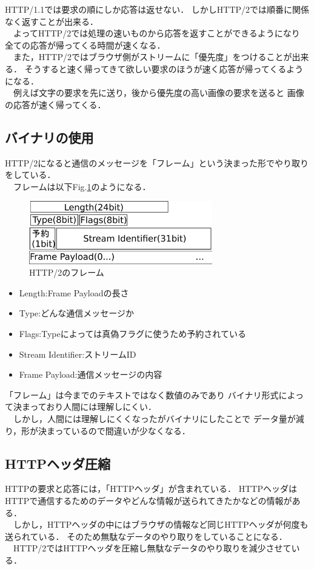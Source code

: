 \documentclass[a4j,9pt,twocolumn]{jsarticle}
\begin{document}
HTTP/1.1では要求の順にしか応答は返せない．
しかしHTTP/2では順番に関係なく返すことが出来る．
\\　よってHTTP/2では処理の速いものから応答を返すことができるようになり
全ての応答が帰ってくる時間が速くなる．
\\　また，HTTP/2ではブラウザ側がストリームに「優先度」をつけることが出来る．
そうすると速く帰ってきて欲しい要求のほうが速く応答が帰ってくるようになる．
\\　例えば文字の要求を先に送り，後から優先度の高い画像の要求を送ると
画像の応答が速く帰ってくる．



\subsection{バイナリの使用}
HTTP/2になると通信のメッセージを「フレーム」という決まった形でやり取りをしている．
\\　フレームは以下Fig.\ref{HTTP2frame}のようになる．
\begin{figure}[h]
\centering
\includegraphics[width=80mm]{img/frame2.eps}
\caption{HTTP/2のフレーム}
\label{HTTP2frame}
\end{figure}

\begin{itemize}
 \item  Length:Frame Payloadの長さ
 \item Type:どんな通信メッセージか
 \item Flags:Typeによっては真偽フラグに使うため予約されている
 \item Stream Identifier:ストリームID
 \item Frame Payload:通信メッセージの内容
\end{itemize}

「フレーム」は今までのテキストではなく数値のみであり
バイナリ形式によって決まっており人間には理解しにくい．
\\　しかし，人間には理解しにくくなったがバイナリにしたことで
データ量が減り，形が決まっているので間違いが少なくなる．


\subsection{HTTPヘッダ圧縮}
HTTPの要求と応答には，「HTTPヘッダ」が含まれている．
HTTPヘッダはHTTPで通信するためのデータやどんな情報が送られてきたかなどの情報がある．
\\　しかし，HTTPヘッダの中にはブラウザの情報など同じHTTPヘッダが何度も送られている．
そのため無駄なデータのやり取りをしていることになる．
\\　HTTP/2ではHTTPヘッダを圧縮し無駄なデータのやり取りを減少させている．
\end{document}
